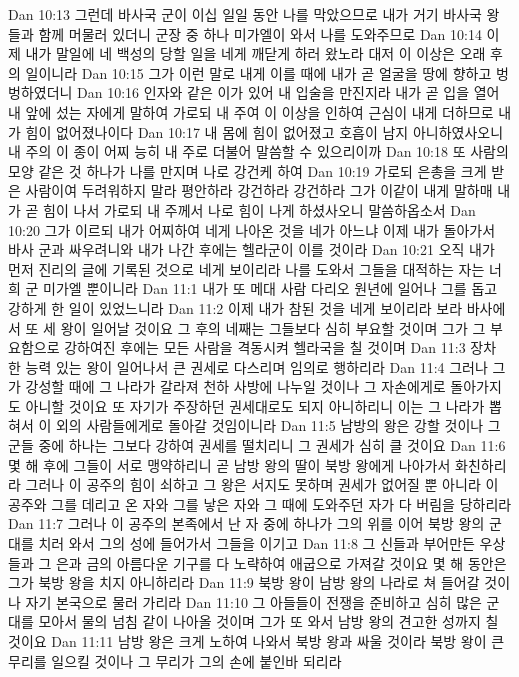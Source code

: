 Dan 10:13  그런데 바사국 군이 이십 일일 동안 나를 막았으므로 내가 거기 바사국 왕들과 함께 머물러 있더니 군장 중 하나 미가엘이 와서 나를 도와주므로
Dan 10:14  이제 내가 말일에 네 백성의 당할 일을 네게 깨닫게 하러 왔노라 대저 이 이상은 오래 후의 일이니라
Dan 10:15  그가 이런 말로 내게 이를 때에 내가 곧 얼굴을 땅에 향하고 벙벙하였더니
Dan 10:16  인자와 같은 이가 있어 내 입술을 만진지라 내가 곧 입을 열어 내 앞에 섰는 자에게 말하여 가로되 내 주여 이 이상을 인하여 근심이 내게 더하므로 내가 힘이 없어졌나이다
Dan 10:17  내 몸에 힘이 없어졌고 호흡이 남지 아니하였사오니 내 주의 이 종이 어찌 능히 내 주로 더불어 말씀할 수 있으리이까
Dan 10:18  또 사람의 모양 같은 것 하나가 나를 만지며 나로 강건케 하여
Dan 10:19  가로되 은총을 크게 받은 사람이여 두려워하지 말라 평안하라 강건하라 강건하라 그가 이같이 내게 말하매 내가 곧 힘이 나서 가로되 내 주께서 나로 힘이 나게 하셨사오니 말씀하옵소서
Dan 10:20  그가 이르되 내가 어찌하여 네게 나아온 것을 네가 아느냐 이제 내가 돌아가서 바사 군과 싸우려니와 내가 나간 후에는 헬라군이 이를 것이라
Dan 10:21  오직 내가 먼저 진리의 글에 기록된 것으로 네게 보이리라 나를 도와서 그들을 대적하는 자는 너희 군 미가엘 뿐이니라
Dan 11:1  내가 또 메대 사람 다리오 원년에 일어나 그를 돕고 강하게 한 일이 있었느니라
Dan 11:2  이제 내가 참된 것을 네게 보이리라 보라 바사에서 또 세 왕이 일어날 것이요 그 후의 네째는 그들보다 심히 부요할 것이며 그가 그 부요함으로 강하여진 후에는 모든 사람을 격동시켜 헬라국을 칠 것이며
Dan 11:3  장차 한 능력 있는 왕이 일어나서 큰 권세로 다스리며 임의로 행하리라
Dan 11:4  그러나 그가 강성할 때에 그 나라가 갈라져 천하 사방에 나누일 것이나 그 자손에게로 돌아가지도 아니할 것이요 또 자기가 주장하던 권세대로도 되지 아니하리니 이는 그 나라가 뽑혀서 이 외의 사람들에게로 돌아갈 것임이니라
Dan 11:5  남방의 왕은 강할 것이나 그 군들 중에 하나는 그보다 강하여 권세를 떨치리니 그 권세가 심히 클 것이요
Dan 11:6  몇 해 후에 그들이 서로 맹약하리니 곧 남방 왕의 딸이 북방 왕에게 나아가서 화친하리라 그러나 이 공주의 힘이 쇠하고 그 왕은 서지도 못하며 권세가 없어질 뿐 아니라 이 공주와 그를 데리고 온 자와 그를 낳은 자와 그 때에 도와주던 자가 다 버림을 당하리라
Dan 11:7  그러나 이 공주의 본족에서 난 자 중에 하나가 그의 위를 이어 북방 왕의 군대를 치러 와서 그의 성에 들어가서 그들을 이기고
Dan 11:8  그 신들과 부어만든 우상들과 그 은과 금의 아름다운 기구를 다 노략하여 애굽으로 가져갈 것이요 몇 해 동안은 그가 북방 왕을 치지 아니하리라
Dan 11:9  북방 왕이 남방 왕의 나라로 쳐 들어갈 것이나 자기 본국으로 물러 가리라
Dan 11:10  그 아들들이 전쟁을 준비하고 심히 많은 군대를 모아서 물의 넘침 같이 나아올 것이며 그가 또 와서 남방 왕의 견고한 성까지 칠 것이요
Dan 11:11  남방 왕은 크게 노하여 나와서 북방 왕과 싸울 것이라 북방 왕이 큰 무리를 일으킬 것이나 그 무리가 그의 손에 붙인바 되리라

